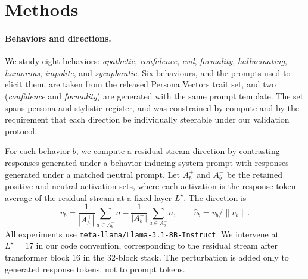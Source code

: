 \documentclass{article}
\begin{document}
\section{Methods}

\paragraph{Behaviors and directions.}
We study eight behaviors: \emph{apathetic}, \emph{confidence}, \emph{evil}, \emph{formality},
\emph{hallucinating}, \emph{humorous}, \emph{impolite}, and \emph{sycophantic}. Six behaviours, and the prompts used to elicit them, are taken from
the released Persona Vectors trait set, and two (\emph{confidence} and \emph{formality}) are generated
with the same prompt template. The set spans persona and stylistic register, and was constrained by
compute and by the requirement that each direction be individually steerable under our validation
protocol.

For each behavior $b$, we compute a residual-stream direction by contrasting responses generated
under a behavior-inducing system prompt with responses generated under a matched neutral prompt.
Let $A_b^+$ and $A_b^-$ be the retained positive and neutral activation sets, where each activation
is the response-token average of the residual stream at a fixed layer $L^\star$. The direction is
\begin{equation}
  v_b = \frac{1}{|A_b^+|}\sum_{a\in A_b^+}a
      - \frac{1}{|A_b^-|}\sum_{a\in A_b^-}a,
  \qquad
  \hat v_b = v_b/\lVert v_b\rVert .
  \label{eq:direction}
\end{equation}
All experiments use \texttt{meta-llama/Llama-3.1-8B-Instruct}. We intervene at $L^\star=17$ in
our code convention, corresponding to the residual stream after transformer block $16$ in the
32-block stack. The perturbation is added only to generated response tokens, not to prompt tokens.
\end{document}
